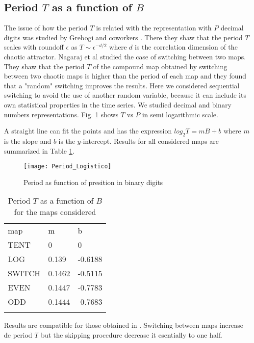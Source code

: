 \subsection{Period $T$ as a function of $B$}

The issue of how the period $T$ is related with the representation with $P$ decimal digits was studied by Grebogi and coworkers \cite{Grebogi1988}.
There they shaw that the period $T$ scales with roundoff $\epsilon$ as $T\sim\epsilon^{-d/2}$ where $d$ is the correlation dimension of the chaotic attractor.
Nagaraj et al \cite{Nagaraj2008} studied the case of switching between two maps.
They shaw that the period $T$ of the compound map obtained by switching between two chaotic maps is higher than the period of each map and they found that a "random" switching improves the results.
Here we considered  sequential switching to avoid the use of another random variable, because it can include its own statistical properties in the time series.
We studied decimal and binary numbers representations. Fig. \ref{fig:period} shows  $T$ vs $P$ in semi logarithmic scale.

A straight line can fit the points and has the expression $log_{2}T=m B + b$ where $m$ is the slope and $b$ is the $y$-intercept.
Results for all considered maps are summarized in Table \ref{tabla:periodos}.

\begin{figure}
	\texttt{[image: Period\_Logistico]}
	\caption{Period as function of presition in binary digits} \label{fig:period}
\end{figure}

\begin{table}
	\caption{Period $T$ as a function of $B$ for the maps considered}
	\label{tabla:periodos}
	\begin{tabular}{lll}
		\hline\noalign{\smallskip}
		map & m & b  \\
		\noalign{\smallskip}\hline\noalign{\smallskip}
		TENT&0 & 0 \\
		LOG &0.139 & -0.6188 \\
		SWITCH &0.1462 & -0.5115 \\
		EVEN &0.1447 & -0.7783 \\
		ODD &0.1444 & -0.7683 \\
		\noalign{\smallskip}\hline
	\end{tabular}
\end{table}

Results are compatible for those obtained in \cite{Nagaraj2008}. Switching between maps increase de period $T$ but the skipping procedure decrease it esentially to one half. 

